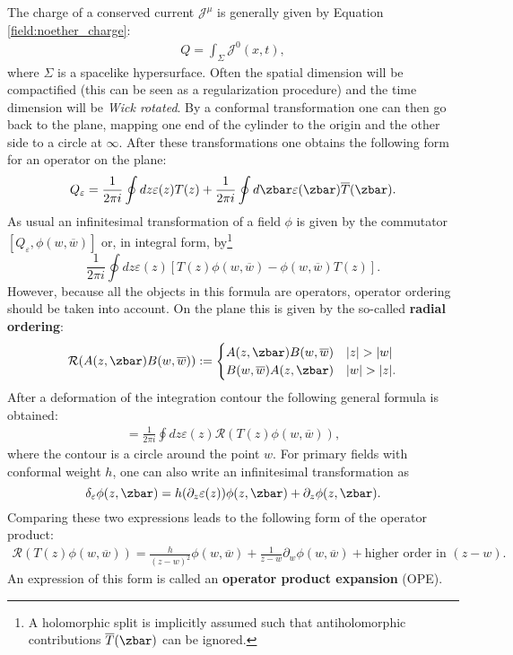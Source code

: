     The charge of a conserved current $\mathcal{J}^\mu$ is generally given by Equation \eqref{field:noether_charge}:
    \begin{gather}
        Q = \int_\Sigma\mathcal{J}^0(x,t),
    \end{gather}
    where $\Sigma$ is a spacelike hypersurface. Often the spatial dimension will be compactified (this can be seen as a regularization procedure) and the time dimension will be \textit{Wick rotated}. By a conformal transformation one can then go back to the plane, mapping one end of the cylinder to the origin and the other side to a circle at $\infty$. After these transformations one obtains the following form for an operator on the plane:
    \begin{gather}
        Q_\varepsilon = \frac{1}{2\pi i}\oint dz\varepsilon(z)T(z) + \frac{1}{2\pi i}\oint d\zbar\varepsilon(\zbar)\overline{T}(\zbar).
    \end{gather}
    As usual an infinitesimal transformation of a field $\phi$ is given by the commutator $[Q_\varepsilon,\phi(w,\overline{w})]$ or, in integral form, by\footnote{A holomorphic split is implicitly assumed such that antiholomorphic contributions $\overline{T}(\zbar)$ can be ignored.} \[\frac{1}{2\pi i}\oint dz\varepsilon(z)[T(z)\phi(w,\overline{w}) - \phi(w,\overline{w})T(z)].\] However, because all the objects in this formula are operators, operator ordering should be taken into account. On the plane this is given by the so-called \textbf{radial ordering}:
    \begin{gather}
        \mathcal{R}(A(z,\zbar)B(w,\overline{w})) :=
        \begin{cases}
            A(z,\zbar)B(w,\overline{w})&|z|>|w|\\
            B(w,\overline{w})A(z,\zbar)&|w|>|z|.
        \end{cases}
    \end{gather}
    After a deformation of the integration contour the following general formula is obtained:
    \begin{gather}
        [Q_\varepsilon,\phi(w,\overline{w})] = \frac{1}{2\pi i}\oint dz\varepsilon(z)\mathcal{R}(T(z)\phi(w,\overline{w})),
    \end{gather}
    where the contour is a circle around the point $w$. For primary fields with conformal weight $h$, one can also write an infinitesimal transformation as \[\delta_\varepsilon\phi(z,\zbar) = h(\partial_z\varepsilon(z))\phi(z,\zbar) + \partial_z\phi(z,\zbar).\] Comparing these two expressions leads to the following form of the operator product:
    \begin{gather}
        \mathcal{R}(T(z)\phi(w,\overline{w})) = \frac{h}{(z-w)^2}\phi(w,\overline{w}) + \frac{1}{z-w}\partial_w\phi(w,\overline{w}) + \text{higher order in } (z-w).
    \end{gather}
    An expression of this form is called an \textbf{operator product expansion} (OPE).

